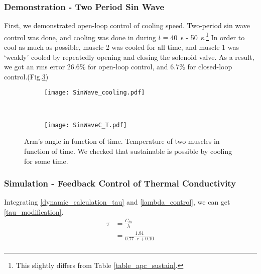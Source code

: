 \tocless \subsubsection{Demonstration - Two Period Sin Wave}
First, we demonstrated open-loop control of cooling speed. Two-period sin wave control was done, and cooling was done in during $t=$\SI{40}{\second} - \SI{50}{\second}.\footnote{This slightly differs from Table \ref{table_apc_sustain}.} In order to cool as much as possible, muscle 2 was cooled for all time, and muscle 1 was `weakly' cooled by repeatedly opening and closing the solenoid valve. As a result, we got an rms error 26.6\% for open-loop control, and 6.7\% for closed-loop control.(Fig.\ref{sustain_demo})

\begin{figure}[t]
	\centering
	\begin{subfigure}[t]{0.47\textwidth}
		\texttt{[image: SinWave\_cooling.pdf]}
		\caption{\label{SinWave_cooling}}
	\end{subfigure}
	~
	\begin{subfigure}[t]{0.46\textwidth}
		\texttt{[image: SinWaveC\_T.pdf]}
		\caption{\label{Sinwave_C_T}}
	\end{subfigure}
	\caption[Sustainable open-loop \apc demonstration]{ Arm's angle in function of time.  Temperature of two muscles in function of time. We checked that sustainable \apc is possible by cooling for some time.}
	\label{sustain_demo}
\end{figure}

\tocless \subsubsection{Simulation - Feedback Control of Thermal Conductivity}


Integrating \eqref{dynamic_calculation_tau} and \eqref{lambda_control}, we can get \eqref{tau_modification}.
\begin{equation} \label{tau_modification} 
\begin{aligned} 
\tau & = \frac{C_{th}}{\lambda} \\
& = \frac{1.81}{0.77\cdot r + 0.10} \\ 
\end{aligned}
\end{equation}

